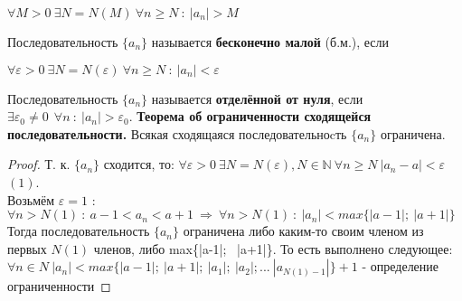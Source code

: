 \documentclass[12pt]{article}
\begin{document}
    \begin{center}
        $\forall M > 0 \ \exists N = N(M) \ \forall n \geq N \ : \ |a_n| > M$
    \end{center}
    Последовательность $\{a_n\}$ называется \textbf{бесконечно малой} (б.м.), если 
    \begin{center}
        $\forall \varepsilon > 0 \ \exists N = N(\varepsilon) \ \forall n \geq N \ : \ |a_n| < \varepsilon$
    \end{center}
    Последовательность $\{a_n\}$ называется \textbf{отделённой от нуля}, если $\exists \varepsilon_0 \neq 0 \ \ \forall n \ : \ |a_n| > \varepsilon_0$.
    \textbf{Теорема об ограниченности сходящейся последовательности.} Всякая сходящаяся последовательноcть $\{a_n\}$ ограничена.
    \begin{proof}
        Т. к. $\{a_n\}$ сходится, то: $\forall \varepsilon  > 0 \ \exists N = N(\varepsilon), N \in \mathbb{N} \ \forall n \geq N \ |a_n - a| < \varepsilon$ \ \ $(1)$. \\
        Возьмём $\varepsilon = 1$ :  $\forall n > N(1) \ : \ a - 1 < a_n < a + 1 \ \Rightarrow \ \forall n > N(1) \ : \ |a_n| < max\{|a-1|; \ |a+1|\}$ \\
        Тогда последовательность $\{a_n\}$ ограничена либо каким-то своим членом из первых $N(1)$ членов, либо max\{|a-1|; \ |a+1|\}. То есть выполнено следующее: \\ $\forall n \in N \ |a_n| < max\{|a-1|; \ |a+1|; \ |a_1|; \ |a_2|; ... \ |a_{N(1) - 1}| \} + 1$ - определение ограниченности
    \end{proof}
\end{document}
